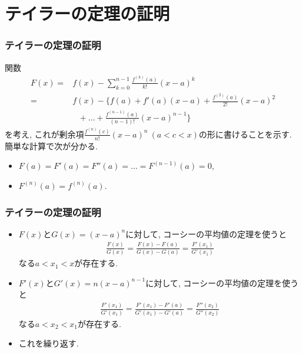 \documentclass[dvipdfmx,cjk,10.2pt]{beamer}
\theoremstyle{definition}
\begin{document}


\section{テイラーの定理の証明}

\begin{frame}
\frametitle{テイラーの定理の証明}

関数 \vspace{-5mm}
\begin{align*}
 F(x) =&  f(x)-\sum_{k=0}^{n-1}\frac{f^{(k)}(a)}{k!}(x-a)^k \\
=&   f(x)-\big\{ f(a)+ f'(a)(x-a) + \frac{f^{(2)}(a)}{2!}(x-a)^2   \\
& \ \ \ + \dots + \frac{f^{(n-1)}(a)}{(n-1)!}(x-a)^{n-1}\big\}
\end{align*}
を考え, これが剰余項$\frac{f^{(n)}(c)}{n!}(x-a)^n \ (a<c<x)$の形に書けることを示す. 
簡単な計算で次が分かる. 
\begin{itemize}
\item $F(a)=F'(a)=F''(a)= \dots =F^{(n-1)}(a)=0$, 
\item $F^{(n)}(a)=f^{(n)}(a)$. 
\end{itemize}  

\end{frame}





\begin{frame}
\frametitle{テイラーの定理の証明}

\begin{itemize}
\item $F(x)$と$G(x)=(x-a)^n$に対して, コーシーの平均値の定理を使うと
\begin{align*}
\frac{F(x)}{G(x)}=\frac{F(x)-F(a)}{G(x)-G(a)}=\frac{F'(x_1)}{G'(x_1)}
\end{align*}
なる$a<x_1<x$が存在する. 
\item $F'(x)$と$G'(x)=n(x-a)^{n-1}$に対して, コーシーの平均値の定理を使うと
\begin{align*}
\frac{F'(x_1)}{G'(x_1)}=\frac{F'(x_1)-F'(a)}{G'(x_1)-G'(a)}=\frac{F''(x_2)}{G''(x_2)}
\end{align*}
なる$a<x_2<x_1$が存在する. 
\item これを繰り返す. 
\end{itemize}
\end{frame}
\end{document}
